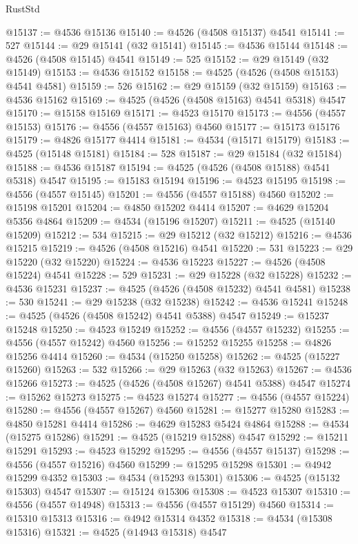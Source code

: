 \begin{lexlean}{RustStd}
\begin{coremodule}
{\begin{coremodule}
{{{{{{{{{{{{{{{{{{{{{{{{{{{{{{{{{{{{{{{{{{{{{{{{{{{{{{{@15137 := @4536 @15136
@15140 := @4526 (@4508 @15137) @4541
@15141 := 527
@15144 := @29 @15141 (@32 @15141)
@15145 := @4536 @15144
@15148 := @4526 (@4508 @15145) @4541
@15149 := 525
@15152 := @29 @15149 (@32 @15149)
@15153 := @4536 @15152
@15158 := @4525 (@4526 (@4508 @15153) @4541 @4581)
@15159 := 526
@15162 := @29 @15159 (@32 @15159)
@15163 := @4536 @15162
@15169 := @4525 (@4526 (@4508 @15163) @4541 @5318) @4547
@15170 := @15158 @15169
@15171 := @4523 @15170
@15173 := @4556 (@4557 @15153)
@15176 := @4556 (@4557 @15163) @4560
@15177 := @15173 @15176
@15179 := @4826 @15177 @4414
@15181 := @4534 (@15171 @15179)
@15183 := @4525 (@15148 @15181)
@15184 := 528
@15187 := @29 @15184 (@32 @15184)
@15188 := @4536 @15187
@15194 := @4525 (@4526 (@4508 @15188) @4541 @5318) @4547
@15195 := @15183 @15194
@15196 := @4523 @15195
@15198 := @4556 (@4557 @15145)
@15201 := @4556 (@4557 @15188) @4560
@15202 := @15198 @15201
@15204 := @4850 @15202 @4414
@15207 := @4629 @15204 @5356 @4864
@15209 := @4534 (@15196 @15207)
@15211 := @4525 (@15140 @15209)
@15212 := 534
@15215 := @29 @15212 (@32 @15212)
@15216 := @4536 @15215
@15219 := @4526 (@4508 @15216) @4541
@15220 := 531
@15223 := @29 @15220 (@32 @15220)
@15224 := @4536 @15223
@15227 := @4526 (@4508 @15224) @4541
@15228 := 529
@15231 := @29 @15228 (@32 @15228)
@15232 := @4536 @15231
@15237 := @4525 (@4526 (@4508 @15232) @4541 @4581)
@15238 := 530
@15241 := @29 @15238 (@32 @15238)
@15242 := @4536 @15241
@15248 := @4525 (@4526 (@4508 @15242) @4541 @5388) @4547
@15249 := @15237 @15248
@15250 := @4523 @15249
@15252 := @4556 (@4557 @15232)
@15255 := @4556 (@4557 @15242) @4560
@15256 := @15252 @15255
@15258 := @4826 @15256 @4414
@15260 := @4534 (@15250 @15258)
@15262 := @4525 (@15227 @15260)
@15263 := 532
@15266 := @29 @15263 (@32 @15263)
@15267 := @4536 @15266
@15273 := @4525 (@4526 (@4508 @15267) @4541 @5388) @4547
@15274 := @15262 @15273
@15275 := @4523 @15274
@15277 := @4556 (@4557 @15224)
@15280 := @4556 (@4557 @15267) @4560
@15281 := @15277 @15280
@15283 := @4850 @15281 @4414
@15286 := @4629 @15283 @5424 @4864
@15288 := @4534 (@15275 @15286)
@15291 := @4525 (@15219 @15288) @4547
@15292 := @15211 @15291
@15293 := @4523 @15292
@15295 := @4556 (@4557 @15137)
@15298 := @4556 (@4557 @15216) @4560
@15299 := @15295 @15298
@15301 := @4942 @15299 @4352
@15303 := @4534 (@15293 @15301)
@15306 := @4525 (@15132 @15303) @4547
@15307 := @15124 @15306
@15308 := @4523 @15307
@15310 := @4556 (@4557 @14948)
@15313 := @4556 (@4557 @15129) @4560
@15314 := @15310 @15313
@15316 := @4942 @15314 @4352
@15318 := @4534 (@15308 @15316)
@15321 := @4525 (@14943 @15318) @4547
}}}}}}}}}}}}}}}}}}}}}}}}}}}}}}}}}}}}}}}}}}}}}}}}}}}}}}}
\end{coremodule}}
\end{coremodule}
\end{lexlean}
